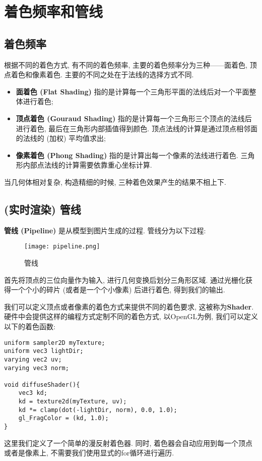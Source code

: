 \chapter{着色频率和管线}

\section{着色频率}
根据不同的着色方式, 有不同的着色频率, 主要的着色频率分为三种——面着色, 顶点着色和像素着色. 主要的不同之处在于法线的选择方式不同. 

\begin{itemize}
	\item \textbf{面着色 (Flat Shading) }指的是计算每一个三角形平面的法线后对一个平面整体进行着色; 
	\item \textbf{顶点着色 (Gouraud Shading) }指的是计算每一个三角形三个顶点的法线后进行着色, 最后在三角形内部插值得到颜色. 顶点法线的计算是通过顶点相邻面的法线的 (加权) 平均值求出; 
	\item \textbf{像素着色 (Phong Shading) }指的是计算出每一个像素的法线进行着色. 三角形内部点法线的计算需要依靠重心坐标计算. 
\end{itemize}
当几何体相对复杂, 构造精细的时候, 三种着色效果产生的结果不相上下. 

\section{ (实时渲染) 管线}
\textbf{管线 (Pipeline) }是从模型到图片生成的过程. 管线分为以下过程: 
\begin{figure}[H]
	\centering
	\texttt{[image: pipeline.png]}
	\caption{管线}
	\label{fig:pipeline}
\end{figure}

首先将顶点的三位向量作为输入, 进行几何变换后划分三角形区域. 通过光栅化获得一个个小的碎片 (或者是一个个小像素) 后进行着色, 得到我们的输出. 

我们可以定义顶点或者像素的着色方式来提供不同的着色要求, 这被称为\textbf{Shader}. 硬件中会提供这样的编程方式定制不同的着色方式, 以OpenGL为例, 我们可以定义以下的着色函数: 
\begin{lstlisting}
uniform sampler2D myTexture;
uniform vec3 lightDir;
varying vec2 uv;
varying vec3 norm;

void diffuseShader(){
	vec3 kd;
	kd = texture2d(myTexture, uv);
	kd *= clamp(dot(-lightDir, norm), 0.0, 1.0);
	gl_FragColor = (kd, 1.0);
}
\end{lstlisting}
这里我们定义了一个简单的漫反射着色器. 同时, 着色器会自动应用到每一个顶点或者是像素上, 不需要我们使用显式的for循环进行遍历. 

